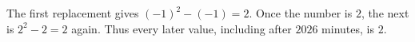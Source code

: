 The first replacement gives $(-1)^2-(-1)=2$. Once the number is $2$, the next is $2^2-2=2$ again. Thus every later value, including after $2026$ minutes, is $\boxed2$.
